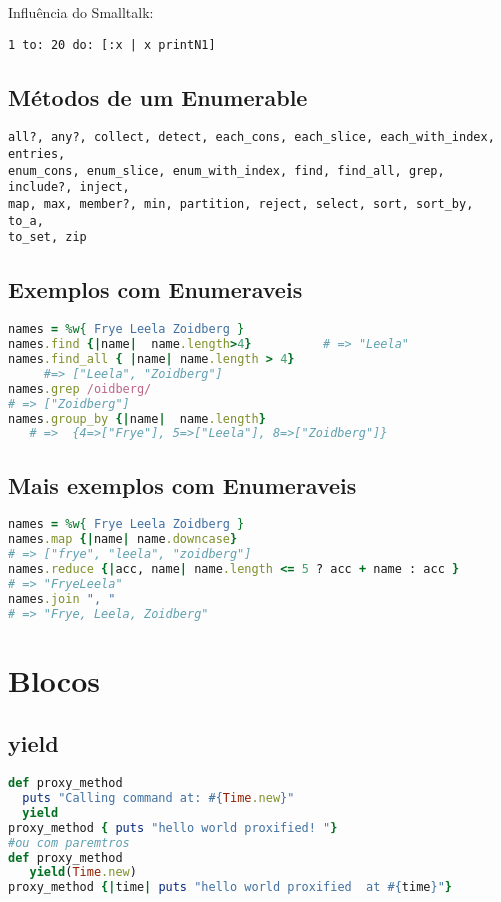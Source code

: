 \documentclass[serif,mathserif]{article}
\begin{document}
Influência do Smalltalk:
\begin{lstlisting}[language=smalltalk]
   1 to: 20 do: [:x | x printN1]
\end{lstlisting}

\subsection{ Métodos de um Enumerable}
\begin{lstlisting}  
all?, any?, collect, detect, each_cons, each_slice, each_with_index, entries,
enum_cons, enum_slice, enum_with_index, find, find_all, grep, include?, inject,
map, max, member?, min, partition, reject, select, sort, sort_by, to_a,
to_set, zip
\end{lstlisting}
 
\subsection{Exemplos com Enumeraveis}
\begin{lstlisting}[language=ruby]
names = %w{ Frye Leela Zoidberg }
names.find {|name|  name.length>4}          # => "Leela"
names.find_all { |name| name.length > 4}
     #=> ["Leela", "Zoidberg"]
names.grep /oidberg/
# => ["Zoidberg"]
names.group_by {|name|  name.length}
   # =>  {4=>["Frye"], 5=>["Leela"], 8=>["Zoidberg"]}
\end{lstlisting}

\subsection{Mais exemplos com Enumeraveis}
\begin{lstlisting}[language=ruby]
names = %w{ Frye Leela Zoidberg }
names.map {|name| name.downcase}
# => ["frye", "leela", "zoidberg"]
names.reduce {|acc, name| name.length <= 5 ? acc + name : acc }
# => "FryeLeela"
names.join ", "
# => "Frye, Leela, Zoidberg"
\end{lstlisting}


\section{Blocos}

\subsection{yield}
\begin{lstlisting}[language=ruby]
def proxy_method
  puts "Calling command at: #{Time.new}"
  yield
proxy_method { puts "hello world proxified! "}
#ou com paremtros
def proxy_method
   yield(Time.new)
proxy_method {|time| puts "hello world proxified  at #{time}"}
\end{lstlisting}
\end{document}

